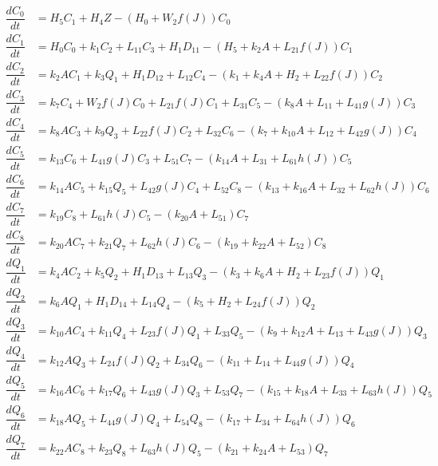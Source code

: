 \begin{align*}
\dfrac{dC_{0}}{dt} & =H_{5}C_{1}+H_{4}Z-\left(H_{0}+W_{2}f\left(J\right)\right)C_{0}\\
\dfrac{dC_{1}}{dt} & =H_{0}C_{0}+k_{1}C_{2}+L_{11}C_{3}+H_{1}D_{11}-\left(H_{5}+k_{2}A+L_{21}f\left(J\right)\right)C_{1}\\
\dfrac{dC_{2}}{dt} & =k_{2}AC_{1}+k_{3}Q_{1}+H_{1}D_{12}+L_{12}C_{4}-\left(k_{1}+k_{4}A+H_{2}+L_{22}f\left(J\right)\right)C_{2}\\
\dfrac{dC_{3}}{dt} & =k_{7}C_{4}+W_{2}f\left(J\right)C_{0}+L_{21}f\left(J\right)C_{1}+L_{31}C_{5}-\left(k_{8}A+L_{11}+L_{41}g\left(J\right)\right)C_{3}\\
\dfrac{dC_{4}}{dt} & =k_{8}AC_{3}+k_{9}Q_{3}+L_{22}f\left(J\right)C_{2}+L_{32}C_{6}-\left(k_{7}+k_{10}A+L_{12}+L_{42}g\left(J\right)\right)C_{4}\\
\dfrac{dC_{5}}{dt} & =k_{13}C_{6}+L_{41}g\left(J\right)C_{3}+L_{51}C_{7}-\left(k_{14}A+L_{31}+L_{61}h\left(J\right)\right)C_{5}\\
\dfrac{dC_{6}}{dt} & =k_{14}AC_{5}+k_{15}Q_{5}+L_{42}g\left(J\right)C_{4}+L_{52}C_{8}-\left(k_{13}+k_{16}A+L_{32}+L_{62}h\left(J\right)\right)C_{6}\\
\dfrac{dC_{7}}{dt} & =k_{19}C_{8}+L_{61}h\left(J\right)C_{5}-\left(k_{20}A+L_{51}\right)C_{7}\\
\dfrac{dC_{8}}{dt} & =k_{20}AC_{7}+k_{21}Q_{7}+L_{62}h\left(J\right)C_{6}-\left(k_{19}+k_{22}A+L_{52}\right)C_{8}\\
\dfrac{dQ_{1}}{dt} & =k_{4}AC_{2}+k_{5}Q_{2}+H_{1}D_{13}+L_{13}Q_{3}-\left(k_{3}+k_{6}A+H_{2}+L_{23}f\left(J\right)\right)Q_{1}\\
\dfrac{dQ_{2}}{dt} & =k_{6}AQ_{1}+H_{1}D_{14}+L_{14}Q_{4}-\left(k_{5}+H_{2}+L_{24}f\left(J\right)\right)Q_{2}\\
\dfrac{dQ_{3}}{dt} & =k_{10}AC_{4}+k_{11}Q_{4}+L_{23}f\left(J\right)Q_{1}+L_{33}Q_{5}-\left(k_{9}+k_{12}A+L_{13}+L_{43}g\left(J\right)\right)Q_{3}\\
\dfrac{dQ_{4}}{dt} & =k_{12}AQ_{3}+L_{24}f\left(J\right)Q_{2}+L_{34}Q_{6}-\left(k_{11}+L_{14}+L_{44}g\left(J\right)\right)Q_{4}\\
\dfrac{dQ_{5}}{dt} & =k_{16}AC_{6}+k_{17}Q_{6}+L_{43}g\left(J\right)Q_{3}+L_{53}Q_{7}-\left(k_{15}+k_{18}A+L_{33}+L_{63}h\left(J\right)\right)Q_{5}\\
\dfrac{dQ_{6}}{dt} & =k_{18}AQ_{5}+L_{44}g\left(J\right)Q_{4}+L_{54}Q_{8}-\left(k_{17}+L_{34}+L_{64}h\left(J\right)\right)Q_{6}\\
\dfrac{dQ_{7}}{dt} & =k_{22}AC_{8}+k_{23}Q_{8}+L_{63}h\left(J\right)Q_{5}-\left(k_{21}+k_{24}A+L_{53}\right)Q_{7}\\

\end{align*}
